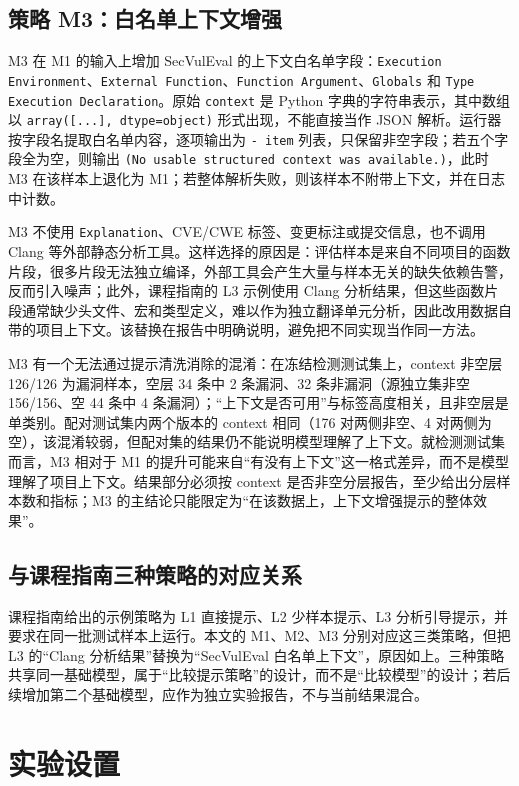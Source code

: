 \documentclass[conference]{IEEEtran}
\begin{document}
\subsection{策略 M3：白名单上下文增强}
M3 在 M1 的输入上增加 SecVulEval 的上下文白名单字段：\texttt{Execution Environment}、\texttt{External Function}、\texttt{Function Argument}、\texttt{Globals} 和 \texttt{Type Execution Declaration}。原始 \texttt{context} 是 Python 字典的字符串表示，其中数组以 \texttt{array([...], dtype=object)} 形式出现，不能直接当作 JSON 解析。运行器按字段名提取白名单内容，逐项输出为 \texttt{- item} 列表，只保留非空字段；若五个字段全为空，则输出 \texttt{(No usable structured context was available.)}，此时 M3 在该样本上退化为 M1；若整体解析失败，则该样本不附带上下文，并在日志中计数。

M3 不使用 \texttt{Explanation}、CVE/CWE 标签、变更标注或提交信息，也不调用 Clang 等外部静态分析工具。这样选择的原因是：评估样本是来自不同项目的函数片段，很多片段无法独立编译，外部工具会产生大量与样本无关的缺失依赖告警，反而引入噪声；此外，课程指南的 L3 示例使用 Clang 分析结果，但这些函数片段通常缺少头文件、宏和类型定义，难以作为独立翻译单元分析，因此改用数据自带的项目上下文。该替换在报告中明确说明，避免把不同实现当作同一方法。

M3 有一个无法通过提示清洗消除的混淆：在冻结检测测试集上，context 非空层 126/126 为漏洞样本，空层 34 条中 2 条漏洞、32 条非漏洞（源独立集非空 156/156、空 44 条中 4 条漏洞）；“上下文是否可用”与标签高度相关，且非空层是单类别。配对测试集内两个版本的 context 相同（176 对两侧非空、4 对两侧为空），该混淆较弱，但配对集的结果仍不能说明模型理解了上下文。就检测测试集而言，M3 相对于 M1 的提升可能来自“有没有上下文”这一格式差异，而不是模型理解了项目上下文。结果部分必须按 context 是否非空分层报告，至少给出分层样本数和指标；M3 的主结论只能限定为“在该数据上，上下文增强提示的整体效果”。

\subsection{与课程指南三种策略的对应关系}
课程指南给出的示例策略为 L1 直接提示、L2 少样本提示、L3 分析引导提示，并要求在同一批测试样本上运行。本文的 M1、M2、M3 分别对应这三类策略，但把 L3 的“Clang 分析结果”替换为“SecVulEval 白名单上下文”，原因如上。三种策略共享同一基础模型，属于“比较提示策略”的设计，而不是“比较模型”的设计；若后续增加第二个基础模型，应作为独立实验报告，不与当前结果混合。

\section{实验设置}
\label{sec:eval}
\end{document}
